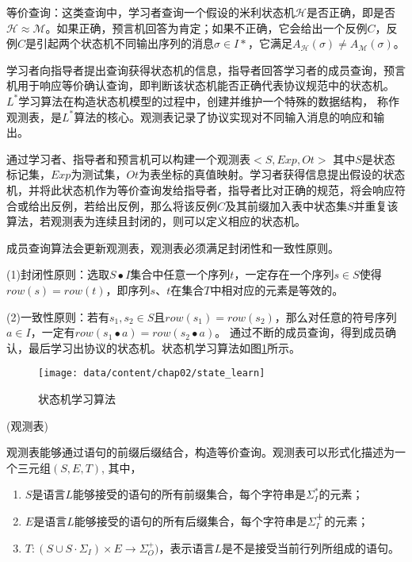等价查询：这类查询中，学习者查询一个假设的米利状态机$\mathsf{\mathcal{H}}$是否正确，即是否$\mathsf{\mathcal{H}}\approx \mathsf{\mathcal{M}}$。如果正确，预言机回答为肯定；如果不正确，它会给出一个反例$C$，反例$C$是引起两个状态机不同输出序列的消息$\sigma \in I*$，它满足${{A}_{\mathsf{\mathcal{H}}}}(\sigma )\ne {{A}_{\mathsf{\mathcal{M}}}}(\sigma )$。

学习者向指导者提出查询获得状态机的信息，指导者回答学习者的成员查询，预言机用于响应等价确认查询，即判断该状态机能否正确代表协议规范中的状态机。$L^{*}$学习算法在构造状态机模型的过程中，创建并维护一个特殊的数据结构，
称作观测表，是$L^{*}$算法的核心。观测表记录了协议实现对不同输入消息的响应和输出。

通过学习者、指导者和预言机可以构建一个观测表$<S,Exp,Ot>$ 其中$S$是状态标记集，$Exp$为测试集，$Ot$为表坐标的真值映射。学习者获得信息提出假设的状态机，并将此状态机作为等价查询发给指导者，指导者比对正确的规范，将会响应符合或给出反例，若给出反例，那么将该反例$C$及其前缀加入表中状态集$S$并重复该算法，若观测表为连续且封闭的，则可以定义相应的状态机。


成员查询算法会更新观测表，观测表必须满足封闭性和一致性原则。

(1)封闭性原则：选取$S \bullet I$集合中任意一个序列$t$，一定存在一个序列$s \in S$使得$row(s)=row(t)$，即序列$s$、$t$在集合$T$中相对应的元素是等效的。

(2)一致性原则：若有$s_1,s_2 \in S$且$row(s_1)=row(s_2)$，那么对任意的符号序列$a \in I$，一定有$row(s_1 \bullet a)=row(s_2 \bullet a)$。
通过不断的成员查询，得到成员确认，最后学习出协议的状态机。状态机学习算法如图\ref{fig-chap02-state_learn}所示。

\begin{figure}[htp]
	\centering
	\texttt{[image: data/content/chap02/state\_learn]}
	\caption{状态机学习算法}
	\label{fig-chap02-state_learn}
\end{figure}

\begin{definition}{(观测表)}

观测表能够通过语句的前缀后缀结合，构造等价查询。观测表可以形式化描述为一个三元组$(S, E, T)$, 其中，
\begin{enumerate}
\item $S$是语言$L$能够接受的语句的所有前缀集合，每个字符串是$\Sigma_{I}^{*}$的元素；
\item $E$是语言$L$能够接受的语句的所有后缀集合，每个字符串是$\Sigma_{I}^{＋}$的元素；
\item $T: (S \cup S\cdot \Sigma_{I}) \times E \rightarrow \Sigma_{O}^{+})$，表示语言$L$是不是接受当前行列所组成的语句。
\end{enumerate}
\end{definition}


